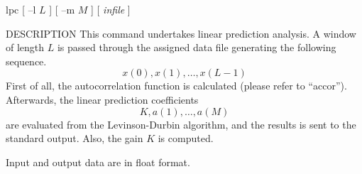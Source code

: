 % 
% 
% 
% 
%                                                                        
%

\begin{synopsis}
\item [lpc] [ --l $L$ ] [ --m $M$ ] [ {\em infile} ] 
\end{synopsis}

\begin{qsection}{DESCRIPTION}
This command undertakes linear prediction analysis.
A window of length $L$ is passed through the assigned
data file generating the following sequence.
\begin{displaymath}
  x(0),x(1),\ldots,x(L-1)
\end{displaymath}
First of all, the autocorrelation function is
calculated (please refer to ``accor'').
Afterwards, the linear prediction coefficients
\begin{displaymath}
  K, a(1), \ldots, a(M)
\end{displaymath}
are evaluated from the Levinson-Durbin algorithm,
and the results is sent to the standard output.
Also, the gain $K$ is computed.
\par
Input and output data are in float format.
\end{qsection}

